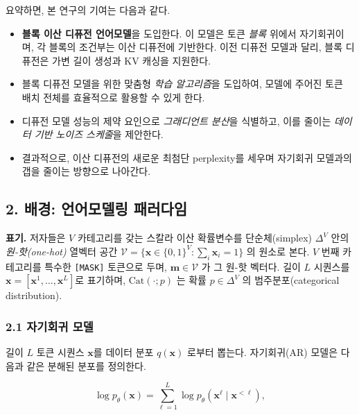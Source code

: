 \documentclass[
]{article}
\providecommand{\tightlist}{%
  \setlength{\itemsep}{0pt}\setlength{\parskip}{0pt}}
\begin{document}
요약하면, 본 연구의 기여는 다음과 같다.

\begin{itemize}
\tightlist
\item
  \textbf{블록 이산 디퓨전 언어모델}을 도입한다. 이 모델은 토큰
  \emph{블록} 위에서 자기회귀이며, 각 블록의 조건부는 이산 디퓨전에
  기반한다. 이전 디퓨전 모델과 달리, 블록 디퓨전은 가변 길이 생성과 KV
  캐싱을 지원한다.
\item
  블록 디퓨전 모델을 위한 맞춤형 \emph{학습 알고리즘}을 도입하여, 모델에
  주어진 토큰 배치 전체를 효율적으로 활용할 수 있게 한다.
\item
  디퓨전 모델 성능의 제약 요인으로 \emph{그래디언트 분산}을 식별하고,
  이를 줄이는 \emph{데이터 기반 노이즈 스케줄}을 제안한다.
\item
  결과적으로, 이산 디퓨전의 새로운 최첨단 perplexity를 세우며 자기회귀
  모델과의 갭을 줄이는 방향으로 나아간다.
\end{itemize}

\hypertarget{uxbc30uxacbd-uxc5b8uxc5b4uxbaa8uxb378uxb9c1-uxd328uxb7ecuxb2e4uxc784}{%
\subsection{2. 배경: 언어모델링
패러다임}\label{uxbc30uxacbd-uxc5b8uxc5b4uxbaa8uxb378uxb9c1-uxd328uxb7ecuxb2e4uxc784}}

\textbf{표기.} 저자들은 \(V\) 카테고리를 갖는 스칼라 이산 확률변수를
단순체(simplex) \(\Delta^V\) 안의 \emph{원-핫(one-hot)} 열벡터 공간
\(\mathcal{V} = \{\mathbf{x} \in \{0, 1\}^V : \sum_i \mathbf{x}_i = 1\}\)
의 원소로 본다. \(V\) 번째 카테고리를 특수한 \texttt{{[}MASK{]}}
토큰으로 두며, \(\mathbf{m} \in \mathcal{V}\) 가 그 원-핫 벡터다. 길이
\(L\) 시퀀스를 \(\mathbf{x} = [\mathbf{x}^1, \dots, \mathbf{x}^L]\)로
표기하며, \(\text{Cat}(\cdot; p)\) 는 확률 \(p \in \Delta^V\) 의
범주분포(categorical distribution).

\hypertarget{uxc790uxae30uxd68cuxadc0-uxbaa8uxb378}{%
\subsubsection{2.1 자기회귀
모델}\label{uxc790uxae30uxd68cuxadc0-uxbaa8uxb378}}

길이 \(L\) 토큰 시퀀스 \(\mathbf{x}\)를 데이터 분포 \(q(\mathbf{x})\)
로부터 뽑는다. 자기회귀(AR) 모델은 다음과 같은 분해된 분포를 정의한다.

\[
\log p_\theta(\mathbf{x}) = \sum_{\ell=1}^{L} \log p_\theta(\mathbf{x}^\ell \mid \mathbf{x}^{<\ell}),
\]
\end{document}
